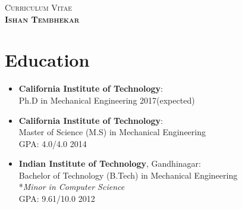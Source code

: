 \documentclass[10pt,fleqn]{article}
\renewcommand{\headrulewidth}{0.4pt}
\begin{document}

\sffamily

\begin{center}
\large %
\scshape Curriculum  Vitae \upshape\\[0.5cm]
\LARGE \textbf{Ishan Tembhekar} \small \\[0.66cm]
\end{center}




\section*{Education}
\begin{itemize}
\item[] \textbf{California Institute of Technology}:\\
		Ph.D  in Mechanical Engineering \hfill 2017(expected)
\item[] \textbf{California Institute of Technology}:\\
		Master of Science (M.S) in Mechanical Engineering\\
		GPA: 4.0/4.0 \hfill 2014
\item[] \textbf{Indian Institute of Technology}, Gandhinagar:\\
		Bachelor of Technology (B.Tech) in Mechanical Engineering\\
		*\textit{Minor in Computer Science}\\
		GPA: 9.61/10.0 \hfill 2012
\end{itemize}
\end{document}
